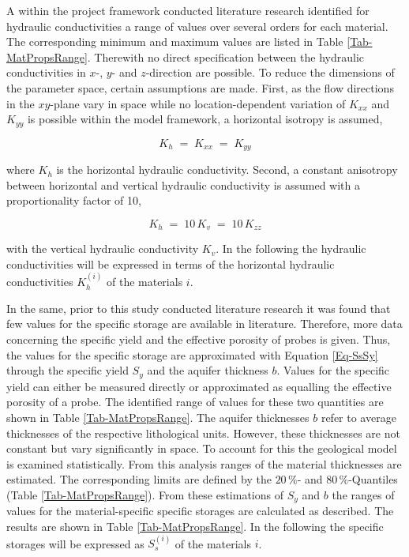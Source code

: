 A within the project framework conducted literature research identified for hydraulic conductivities a range of values over several orders for each material. The corresponding minimum and maximum values are listed in Table \ref{Tab-MatPropsRange}. Therewith no direct specification between the hydraulic conductivities in $x$-, $y$- and $z$-direction are possible. To reduce the dimensions of the parameter space, certain assumptions are made. First, as the flow directions in the $xy$-plane vary in space while no location-dependent variation of $K_{xx}$ and $K_{yy}$ is possible within the model framework, a horizontal isotropy is assumed,

\begin{equation}
    K_h \; = \; K_{xx} \; = \; K_{yy}
\end{equation}

\noindent where $K_h$ is the horizontal hydraulic conductivity. Second, a constant anisotropy between horizontal and vertical hydraulic conductivity is assumed with a proportionality factor of 10,

\begin{equation}
    K_h \; = \; 10 \, K_v \; = \; 10 \, K_{zz}
\end{equation}

\noindent with the vertical hydraulic conductivity $K_v$. In the following the hydraulic conductivities will be expressed in terms of the horizontal hydraulic conductivities $K_{h}^{(i)}$ of the materials $i$.

In the same, prior to this study conducted literature research it was found that few values for the specific storage are available in literature. Therefore, more data concerning the specific yield and the effective porosity of probes is given. Thus, the values for the specific storage are approximated with Equation \eqref{Eq-SsSy} through the specific yield $S_y$ and the aquifer thickness $b$. Values for the specific yield can either be measured directly or approximated as equalling the effective porosity of a probe. The identified range of values for these two quantities are shown in Table \ref{Tab-MatPropsRange}. The aquifer thicknesses $b$ refer to average thicknesses of the respective lithological units. However, these thicknesses are not constant but vary significantly in space. To account for this the geological model is examined statistically. From this analysis ranges of the material thicknesses are estimated. The corresponding limits are defined by the $20 \, \%$- and $80 \, \%$-Quantiles (Table \ref{Tab-MatPropsRange}). From these estimations of $S_y$ and $b$ the ranges of values for the material-specific specific storages are calculated as described. The results are shown in Table \ref{Tab-MatPropsRange}. In the following the specific storages will be expressed as $S_{s}^{(i)}$ of the materials $i$. 

